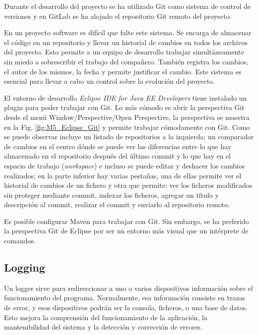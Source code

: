 Durante el desarrollo del proyecto se ha utilizado Git como sistema de control de versiones y en GitLab se ha alojado el repositorio Git remoto del proyecto.

En un proyecto software es difícil que falte este sistema. Se encarga de almacenar el código en un repositorio y llevar un historial de cambios en todos los archivos del proyecto. Esto permite a un equipo de desarrollo trabajar simultáneamente sin miedo a sobrescribir el trabajo del compañero. También registra los cambios, el autor de los mismos, la fecha y permite justificar el cambio. Este sistema es esencial para llevar a cabo un control sobre la evolución del proyecto.

El entorno de desarrollo \textit{Eclipse IDE for Java EE Developers} tiene instalado un plugin para poder trabajar con Git. Lo más cómodo es abrir la perspectiva Git desde el menú Window/Perspective/Open Perspective, la perspectiva se muestra en la Fig. \ref{fig:M5_Eclipse_Git} y permite trabajar cómodamente con Git. Como se puede observar incluye un listado de repositorios a la izquierda; un comparador de cambios en el centro dónde se puede ver las diferencias entre lo que hay almacenado en el repositorio después del último commit y lo que hay en el espacio de trabajo (\textit{workspace}) e incluso se puede editar y deshacer los cambios realizados; en la parte inferior hay varias pestañas, una de ellas permite ver el historial de cambios de un fichero y otra que permite: ver los ficheros modificados sin proteger mediante commit, indexar los ficheros, agregar un título y descripción al commit, realizar el commit y enviarlo al repositorio remoto.


Es posible configurar Maven para trabajar con Git. Sin embargo, se ha preferido la perspectiva Git de Eclipse por ser un entorno más visual que un intérprete de comandos.

\subsection{Logging}

Un logger sirve para redireccionar a uno o varios dispositivos información sobre el funcionamiento del programa. Normalmente, esa información consiste en trazas de error, y esos dispositivos podrán ser la consola, ficheros, o una base de datos. Esto mejora la comprensión del funcionamiento de la aplicación, la mantenibilidad del sistema y la detección y corrección de errores.

